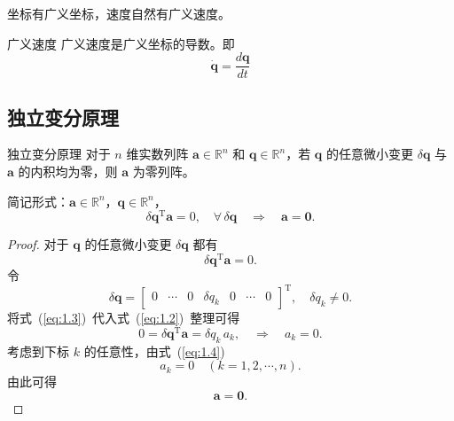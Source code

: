 坐标有广义坐标，速度自然有广义速度。
\begin{mydefinition}{广义速度}
广义速度是广义坐标的导数。即$$\dot{\boldsymbol{q}} = \frac{d\boldsymbol{q}}{dt}$$
\end{mydefinition}

\subsection{独立变分原理}
\begin{myTheorem}{独立变分原理}
对于 $n$ 维实数列阵 $\boldsymbol{a} \in \mathbb{R}^n$ 和 $\boldsymbol{q} \in \mathbb{R}^n$，若 $\boldsymbol{q}$ 的任意微小变更 $\delta\boldsymbol{q}$ 与 $\boldsymbol{a}$ 的内积均为零，则 $\boldsymbol{a}$ 为零列阵。
\end{myTheorem}

\noindent 简记形式：$\boldsymbol{a} \in \mathbb{R}^n$，$\boldsymbol{q} \in \mathbb{R}^n$，
\begin{equation}\label{eq:1.1}
\delta\boldsymbol{q}^{\mathrm{T}} \boldsymbol{a} = 0, \quad \forall\, \delta\boldsymbol{q} \quad \Rightarrow \quad \boldsymbol{a} = \boldsymbol{0}.
\end{equation}

\begin{proof}
对于 $\boldsymbol{q}$ 的任意微小变更 $\delta\boldsymbol{q}$ 都有
\begin{equation}\label{eq:1.2}
\delta\boldsymbol{q}^{\mathrm{T}} \boldsymbol{a} = 0.
\end{equation}
令
\begin{equation}\label{eq:1.3}
\delta\boldsymbol{q} = \begin{bmatrix} 0 & \cdots & 0 & \delta q_k & 0 & \cdots & 0 \end{bmatrix}^{\mathrm{T}}, \quad \delta q_k \neq 0.
\end{equation}
将式~(\ref{eq:1.3})~代入式~(\ref{eq:1.2})~整理可得
\begin{equation}\label{eq:1.4}
0 = \delta\boldsymbol{q}^{\mathrm{T}} \boldsymbol{a} = \delta q_k \, a_k, \quad \Rightarrow \quad a_k = 0.
\end{equation}
考虑到下标 $k$ 的任意性，由式~(\ref{eq:1.4})
\begin{equation}\label{eq:1.5}
a_k = 0 \quad (k = 1, 2, \cdots, n).
\end{equation}
由此可得
\begin{equation}\label{eq:1.6}
\boldsymbol{a} = \boldsymbol{0}.
\end{equation}
\end{proof}


